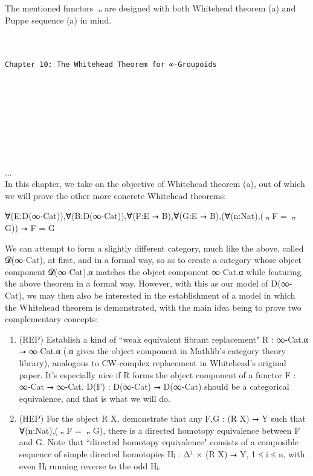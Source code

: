 \documentclass{book}
\theoremstyle{definition}
\newcounter{pcounter}
\newcounter{sectioncount}
\newcounter{subsectioncount}
\renewcommand{\section}[1]{\newpage\ \\ \ \\ \begin{center} \scalebox{1.5}{\texttt{\thesectioncount . #1}} \stepcounter{sectioncount} \setcounter{subsectioncount}{1} \end{center} \begin{center} \ \\ \ \\ \thispagestyle{empty} \end{center}}
\renewcommand{\chapter}[1]{
\newpage
{
\Huge 
\begin{center}
\ \\
\ \\
\thispagestyle{empty}
\texttt{#1}
\end{center}}
\ \\
\ \\
}
\begin{document}
The mentioned functors π⃡ₙ are designed with both Whitehead theorem (a) and Puppe sequence (a) in mind.\\




\chapter{Chapter 10: The Whitehead Theorem for ∞-Groupoids}


\section{Cubical Complexes}

...\\


In this chapter, we take on the objective of Whitehead theorem (a), out of which we will prove the other more concrete Whitehead theorems:\\

\begin{center} ∀(E:D(∞-Cat)),∀(B:D(∞-Cat)),∀(F:E ⭢ B),∀(G:E ⭢ B),(∀(n:Nat),(π⃗ₙ F = π⃗ₙ G)) ⭢ F = G
\end{center}

We can attempt to form a slightly different category, much like the above, called 𝓓(∞-Cat), at first, and in a formal way, so as to create a category whose object component 𝓓(∞-Cat).α matches the object component ∞-Cat.α while featuring the above theorem in a formal way. However, with this as our model of D(∞-Cat), we may then also be interested in the establishment of a model in which the Whitehead theorem is demonstrated, with the main idea being to prove two complementary concepts:

\begin{enumerate}
\item (REP) Establish a kind of ``weak equivalent fibrant replacement" R : ∞-Cat.α ⭢ ∞-Cat.α (.α gives the object component in Mathlib's category theory library), analogous to CW-complex replacement in Whitehead's original paper. It's especially nice if R forms the object component of a functor F : ∞-Cat ⭢ ∞-Cat. D(F) : D(∞-Cat) ⭢ D(∞-Cat) should be a categorical equivalence, and that is what we will do.
\item (HEP) For the object R X, demonstrate that any F,G : (R X) ⭢ Y such that ∀(n:Nat),(π⃗ₙ F = π⃗ₙ G), there is a directed homotopy equivalence between F and G. Note that ``directed homotopy equivalence" consists of a composible sequence of simple directed homotopies Hᵢ : Δ¹ × (R X) ⭢ Y, 1 ≤ i ≤ n, with even Hᵢ running reverse to the odd Hᵢ.
\end{enumerate} 
\end{document}
